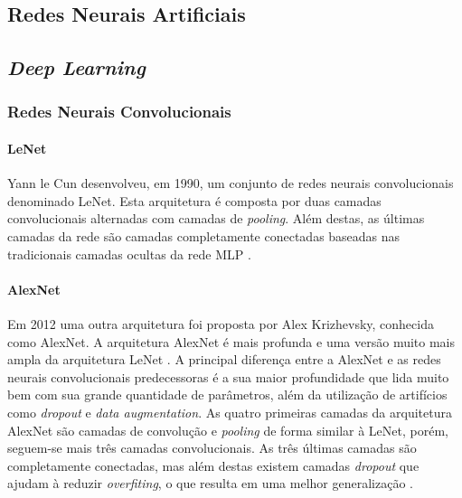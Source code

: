 \subsection{Redes Neurais Artificiais}


\subsection{\textit{Deep Learning}}


\subsubsection{Redes Neurais Convolucionais}



\paragraph{LeNet} Yann le Cun desenvolveu, em 1990, um conjunto de redes neurais convolucionais denominado LeNet. Esta arquitetura é composta por duas camadas convolucionais alternadas com camadas de \textit{pooling}. Além destas, as últimas camadas da rede são camadas completamente conectadas baseadas nas tradicionais camadas ocultas da rede MLP \cite{ref:gulli}. 

\paragraph{AlexNet} Em 2012 uma outra arquitetura foi proposta por Alex Krizhevsky, conhecida como AlexNet. A arquitetura AlexNet é mais profunda e uma versão muito mais ampla da arquitetura LeNet \cite{ref:satapathy}. A principal diferença entre a AlexNet e as redes neurais convolucionais predecessoras é a sua maior profundidade que lida muito bem com sua grande quantidade de parâmetros, além da utilização de artifícios como \textit{dropout} e \textit{data augmentation}. As quatro primeiras camadas da arquitetura AlexNet são camadas de convolução e \textit{pooling} de forma similar à LeNet, porém, seguem-se mais três camadas convolucionais. As três últimas camadas são completamente conectadas, mas além destas existem camadas \textit{dropout} que ajudam à reduzir \textit{overfiting}, o que resulta em uma melhor generalização \cite{ref:khan}.

